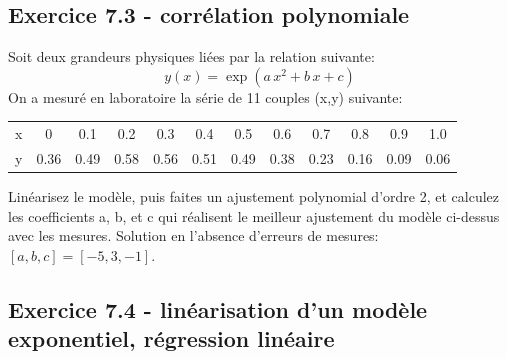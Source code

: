 \documentclass[main.tex]{subfiles}
\begin{document}
\subsection*{Exercice 7.3 - corrélation polynomiale}

Soit deux grandeurs physiques liées par la relation suivante:
$$
    y(x)=\exp{(a\,x^2+b\,x+c)}
$$
On a mesuré en laboratoire la série de 11 couples (x,y) suivante:
\begin{center}
    \begin{tabular}{r|ccccccccccc}
        x & 0    & 0.1  & 0.2  & 0.3  & 0.4  & 0.5  & 0.6  & 0.7  & 0.8  & 0.9  & 1.0  \\
        y & 0.36 & 0.49 & 0.58 & 0.56 & 0.51 & 0.49 & 0.38 & 0.23 & 0.16 & 0.09 & 0.06
    \end{tabular}
\end{center}
Linéarisez le modèle, puis faites un ajustement polynomial d'ordre 2, et calculez les coefficients a, b, et c qui réalisent le meilleur ajustement du modèle ci-dessus avec les mesures. Solution en l'absence d'erreurs de mesures: $[a,b,c]=[-5,3,-1]$.

\subsection*{Exercice 7.4 - linéarisation d'un modèle exponentiel, régression linéaire}
\end{document}
